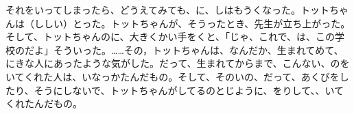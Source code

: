                                                                                                                                                                                                                                                                                                                                                                                                                                                                                                                                                                                                                                                                           それをいってしまったら、どうえてみても、に、しはもうくなった。トットちゃんは（ししい）とった。トットちゃんが、そうったとき、先生が立ち上がった。そして、トットちゃんのに、大きくかい手をくと、「じゃ、これで、は、この学校のだよ」そういった。……その，トットちゃんは、なんだか、生まれてめて、にきな人にあったような気がした。だって、生まれてからまで、こんない、のをいてくれた人は、いなっかたんだもの。そして、そのいの、だって、あくびをしたり、そうにしないで、トットちゃんがしてるのとじように、をりして、、いてくれたんだもの。

